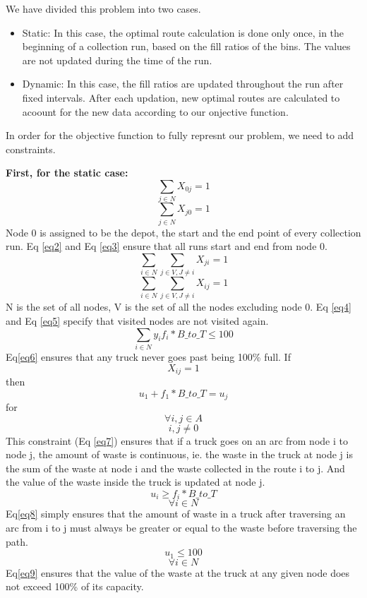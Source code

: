 \documentclass[12pt]{article}
\begin{document}
We have divided this problem into two cases.
\begin{itemize}
    \item Static: In this case, the optimal route calculation is done only once, in the beginning of a collection run, based on the fill ratios of the bins. The values are not updated during the time of the run.
    \item Dynamic: In this case, the fill ratios are updated throughout the run after fixed intervals. After each updation, new optimal routes are calculated to acoount for the new data according to our onjective function.
\end{itemize}

In order for the objective function to fully represnt our problem, we need to add constraints.

\textbf{First, for the static case:}
\begin{equation}\label{eq2}
    \sum_{j\in N} X_{0 j}=1
\end{equation}
\begin{equation}\label{eq3}
    \sum_{j\in N} X_{j0}=1
\end{equation}
Node 0 is assigned to be the depot, the start and the end point of every collection run. Eq \eqref{eq2} and Eq \eqref{eq3} ensure that all runs start and end from node 0.
\begin{equation}\label{eq4}
    \sum_{i\in N}\sum_{j\in V, J\ne i} X_{ji}=1
\end{equation}
\begin{equation}\label{eq5}
    \sum_{i\in N}\sum_{j\in V, J\ne i} X_{ij}=1
\end{equation}
N is the set of all nodes, V is the set of all the nodes excluding node 0. Eq \eqref{eq4}
and Eq \eqref{eq5} specify that visited nodes are not visited again.
\begin{equation}\label{eq6}
    \sum_{i\in N}{y_{i}f_i*B\_to\_T}\le100
\end{equation}
Eq\eqref{eq6} ensures that any truck never goes past being 100\% full.
If
$$ X_{ij}=1$$
then
\begin{equation}\label{eq7}
    u_1+f_1*B\_to\_T =u_j
\end{equation}
for 
$$ \forall i,j \in A$$
$$ i,j\ne 0$$
This constraint (Eq \eqref{eq7}) ensures that if a truck goes on an arc from node i to node j, the amount of waste is continuous, ie. the waste in the truck at node j is the sum of the waste at node i and the waste collected in the route i to j. And the value of the waste inside the truck is updated at node j.
\begin{equation}\label{eq8}
    u_i\ge f_i*B\_to\_T
\end{equation}
$$  \forall i\in N$$
Eq\eqref{eq8} simply ensures that the amount of waste in a truck after traversing an arc from i to j must always be greater or equal to the waste before traversing the path.
\begin{equation}\label{eq9}
    u_1\le100
\end{equation}
$$\forall i\in N $$
Eq\eqref{eq9} ensures that the value of the waste at the truck at any given node does not exceed 100\% of its capacity.
\end{document}
